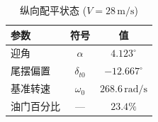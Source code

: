 \begin{table}[H]
\centering
\caption{纵向配平状态 ($V=28\,\text{m/s}$)}
\label{tab:trim}
\small
\begin{tabular}{l c c}
\toprule
\textbf{参数} & \textbf{符号} & \textbf{值} \\
\midrule
迎角 & $\alpha$ & $4.123^\circ$ \\
尾摆偏置 & $\delta_{t0}$ & $-12.667^\circ$ \\
基准转速 & $\omega_0$ & $268.6\,\text{rad/s}$ \\
油门百分比 & — & $23.4\%$ \\
\bottomrule
\end{tabular}
\end{table}